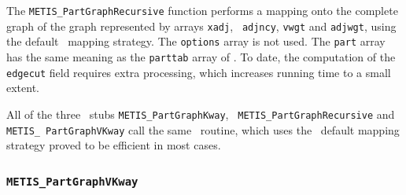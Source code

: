 \begin{itemize}
\progdes

The {\tt METIS\_PartGraphRecursive} function performs a mapping onto
the complete graph of the graph represented by arrays {\tt xadj}, {\tt
adjncy}, {\tt vwgt} and {\tt adjwgt}, using the default \scotch\
mapping strategy. The {\tt options} array is not used. The {\tt part}
array has the same meaning as the {\tt parttab} array of \scotch. To
date, the computation of the {\tt edgecut} field requires extra
processing, which increases running time to a small extent.

All of the three \metis\ stubs
{\tt METIS\_\lbo Part\lbo Graph\lbo Kway}, {\tt
METIS\_\lbo Part\lbo Graph\lbo Recursive} and {\tt METIS\_\lbo
Part\lbo Graph\lbo VKway} call the same \scotch\ routine, which uses
the \scotch\ default mapping strategy proved to be efficient in most
cases.
\end{itemize}

\subsubsection{{\tt METIS\_PartGraphVKway}}

